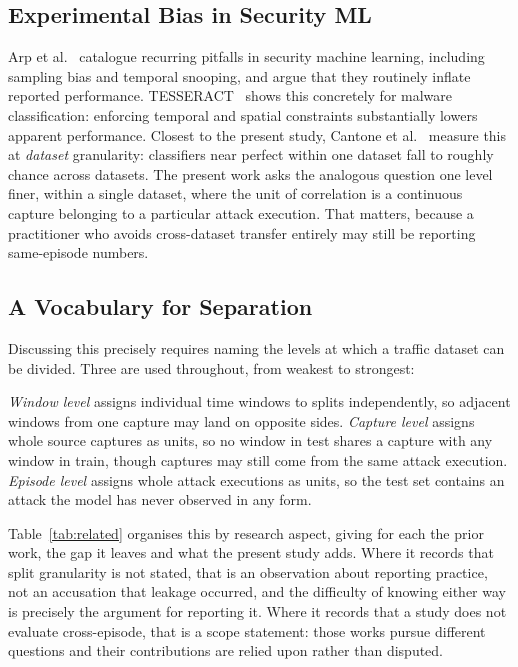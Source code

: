 \documentclass[conference]{IEEEtran} \IEEEoverridecommandlockouts
\begin{document}
\subsection{Experimental Bias in Security ML} Arp et al.~\cite{arp2022dos} catalogue recurring pitfalls in security machine
learning, including sampling bias and temporal snooping, and argue that they
routinely inflate reported performance. TESSERACT~\cite{pendlebury2019tesseract}
shows this concretely for malware classification: enforcing temporal and
spatial constraints substantially lowers apparent performance. Closest to the present study, Cantone et
al.~\cite{cantone2024crossdataset} measure this at \emph{dataset} granularity:
classifiers near perfect within one dataset fall to roughly chance across
datasets. The present work asks the analogous question one level finer, within
a single dataset, where the unit of correlation is a continuous capture
belonging to a particular attack execution. That matters, because a
practitioner who avoids cross-dataset transfer entirely may still be reporting
same-episode numbers.

\subsection{A Vocabulary for Separation} \label{sec:vocab} Discussing this
precisely requires naming the levels at which a traffic dataset can be divided.
Three are used throughout, from weakest to strongest:

\emph{Window level} assigns individual time windows to splits
independently, so adjacent windows from one capture may land on opposite sides.
\emph{Capture level} assigns whole source captures as units, so no window in
test shares a capture with any window in train, though captures may still come
from the same attack execution. \emph{Episode level} assigns whole attack
executions as units, so the test set contains an attack the model has never
observed in any form.


Table~\ref{tab:related} organises this by research aspect, giving for each the
prior work, the gap it leaves and what the present study adds. Where it records
that split granularity is not stated, that is an observation about reporting
practice, not an accusation that leakage occurred, and the difficulty of
knowing either way is precisely the argument for reporting it. Where it records
that a study does not evaluate cross-episode, that is a scope statement: those
works pursue different questions and their contributions are relied upon rather
than disputed.
\end{document}
